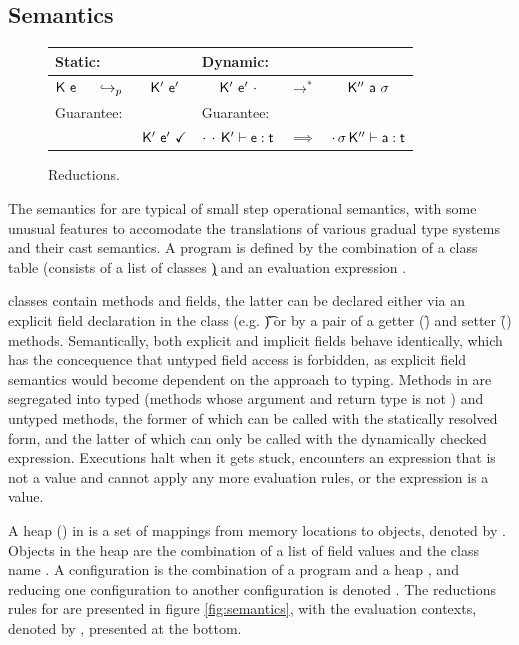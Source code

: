 \documentclass[a4paper,USenglish]{tex/lipics-v2016}
\begin{document}
\subsection{Semantics}

\begin{figure}[!h]
\begin{tabular}{|ccc|ccc|}
\hline
\multicolumn{3}{|l|}{Static:} & \multicolumn{3}{l|}{Dynamic:}\\
\hline
${\sf{K}}~{\sf{e}}$ & $\underline{} ~\hookrightarrow_p~$ & ${{\sf{K'}}}~{{{\sf{e'}}}}$ & 
${{\sf{K'}}}~{{{\sf{e'}}}}~\cdot$ & $\longrightarrow^*$ & ${{\sf{K''}}}~{\sf{a}}~\sigma$ \\
\hline
\multicolumn{3}{|l|}{Guarantee:} & \multicolumn{3}{l|}{Guarantee:}\\
\hline
&& ${{\sf{K'}}}~{{{\sf{e'}}}}~\checkmark$ & 
$\EnvType {\cdot}{\cdot}\Kp\e\t$ & $\implies$ & 
$\EnvType {\cdot}{\s}\Kpp\a\t$ \\\hline
\end{tabular}
\caption{\kafka Reductions.}\label{redu}
\end{figure}

The semantics for \kafka are typical of small step operational semantics, 
with some unusual features to accomodate the translations of various
gradual type systems and their cast semantics. A \kafka program is defined 
by the combination of a class table \K (consists of a list of classes \k)
and an evaluation expression \e. 

\kafka classes contain methods and fields, the latter can be declared 
either via an explicit field declaration in the class
(e.g. \HT\f\t) or by a pair of a getter (\Get\this\f) and setter 
(\Set\this\f\x) methods. Semantically, both explicit and implicit fields behave 
identically, which has the concequence that untyped field access is forbidden, 
as explicit field semantics would become dependent on the approach to typing. 
Methods in \kafka are segregated into typed (methods whose argument and
return type is not \any) and untyped methods, the former of which can be 
called with the statically resolved \Call\e\m\e form, and the latter of
which can only be called with the dynamically checked \DynCall\e\m\e 
expression. Executions halt when it gets stuck, encounters an expression that is 
not a value and cannot apply any more evaluation rules, or the expression is a value.

A heap (\s) in \kafka is a set of mappings from memory locations to objects,
denoted by \Map\s{\Bind\a{\obj\C{\b\a}}}. Objects in the heap are the 
combination of a list of field values \a and the class name \C.
A configuration is the combination of a program \K\e and a heap \s, 
and reducing one configuration \K\e\s to another configuration \Kp\ep\sp 
is denoted \Reduce\K\e\s\Kp\ep\sp. The reductions rules for \kafka are presented 
in figure \ref{fig:semantics}, with the evaluation contexts, denoted by \EE, presented 
at the bottom.
\end{document}
